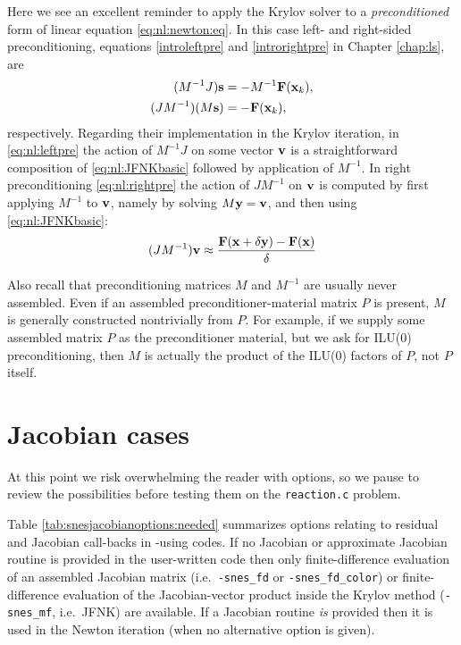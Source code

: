 Here we see an excellent reminder to apply the Krylov solver to a \emph{preconditioned} form of linear equation \eqref{eq:nl:newton:eq}.  In this case left- and right-sided preconditioning, equations \eqref{introleftpre} and \eqref{introrightpre} in Chapter \ref{chap:ls}, are
\begin{align}
(M^{-1} J) \mathbf{s} &= - M^{-1} \mathbf{F}(\mathbf{x}_k), \label{eq:nl:leftpre} \\
(J M^{-1}) (M \mathbf{s}) &= - \mathbf{F}(\mathbf{x}_k), \label{eq:nl:rightpre}
\end{align}
respectively.  Regarding their implementation in the Krylov iteration, in \eqref{eq:nl:leftpre} the action of $M^{-1} J$ on some vector $\mathbf{v}$ is a straightforward composition of \eqref{eq:nl:JFNKbasic} followed by application of $M^{-1}$.  In right preconditioning \eqref{eq:nl:rightpre} the action of $J M^{-1}$ on $\mathbf{v}$ is computed by first applying $M^{-1}$ to $\mathbf{v}$, namely by solving $M \mathbf{y} = \mathbf{v}$, and then using \eqref{eq:nl:JFNKbasic}:
\begin{equation}
(J M^{-1}) \mathbf{v} \approx \frac{\mathbf{F}(\mathbf{x}+\delta \mathbf{y}) - \mathbf{F}(\mathbf{x})}{\delta} \label{eq:nl:JFNKwithrightpre}
\end{equation}

Also recall that preconditioning matrices $M$ and $M^{-1}$ are usually never assembled.  Even if an assembled preconditioner-material matrix $P$ is present, $M$ is generally constructed nontrivially from $P$.  For example, if we supply some assembled matrix $P$ as the preconditioner material, but we ask for ILU($0$) preconditioning, then $M$ is actually the product of the ILU($0$) factors of $P$, not $P$ itself.


\section{Jacobian cases} \label{sec:jacobiancases}

\def\checkmark{\tikz\fill[scale=0.4](0,.35) -- (.25,0) -- (.7,.8) -- (.25,.15) -- cycle;}
\def\bigcheckmark{\tikz\fill[scale=0.6](0,.35) -- (.25,0) -- (.7,.8) -- (.25,.15) -- cycle;}

At this point we risk overwhelming the reader with options, so we pause to review the possibilities before testing them on the \texttt{reaction.c} problem.

Table \ref{tab:snesjacobianoptions:needed} summarizes options relating to residual and Jacobian call-backs in \pSNES-using codes.  If no Jacobian or approximate Jacobian routine is provided in the user-written code then only finite-difference evaluation of an assembled Jacobian matrix (i.e.~\texttt{-snes\_fd} or \texttt{-snes\_fd\_color}) or finite-difference evaluation of the Jacobian-vector product inside the Krylov method (\texttt{-snes\_mf}, i.e.~JFNK) are available.  If a Jacobian routine \emph{is} provided then it is used in the Newton iteration (when no alternative option is given).

